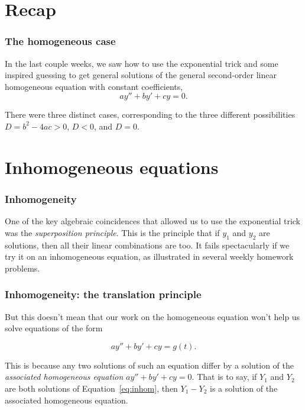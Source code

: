 \def\encoding{UTF-8}

\def\mytitle{Undetermined Coefficients,I}
\def\subtitle{Guess-and-check: expert level}
\def\affiliation{The College of Idaho}
\def\myauthor{Math 352 Differential Equations}
\def\mydate{1 April 2013}
\def\latexmode{beamer}
\def\fonttheme{structurebold}
\def\colortheme{crane}
\def\theme{Szeged}

\def\htmlheaderlevel{2}
\section{Recap}
\label{recap}

\begin{frame}

\frametitle{The homogeneous case}
\label{thehomogeneouscase}

In the last couple weeks, we saw how to use the exponential trick and some inspired guessing to get general solutions of the general second-order linear homogeneous equation with constant coefficients,
\[ ay'' + by' + cy = 0. \]

There were three distinct cases, corresponding to the three different possibilities $ D = b^2 - 4ac > 0 $, $ D < 0 $, and $ D = 0 $.

\end{frame}

\section{Inhomogeneous equations}
\label{inhomogeneousequations}

\begin{frame}

\frametitle{Inhomogeneity}
\label{inhomogeneity}

One of the key algebraic coincidences that allowed us to use the exponential trick was the \emph{superposition principle}. This is the principle that if $ y_1 $ and $ y_2 $ are solutions, then all their linear combinations are too. It fails spectacularly if we try it on an inhomogeneous equation, as illustrated in several weekly homework problems.

\end{frame}

\begin{frame}

\frametitle{Inhomogeneity: the translation principle}
\label{inhomogeneity:thetranslationprinciple}

But this doesn't mean that our work on the homogeneous equation won't help us solve equations of the form

\begin{equation} \label{eq:inhom}
ay'' + by' + cy = g(t).
\end{equation}

This is because any two solutions of such an equation differ by a solution of the \emph{associated homogeneous equation} $ ay'' + by' + cy = 0 $. That is to say, if $ Y_1 $ and $ Y_2 $ are both solutions of Equation~\ref{eq:inhom}, then $ Y_1 - Y_2 $ is a solution of the associated homogeneous equation.

\end{frame}


